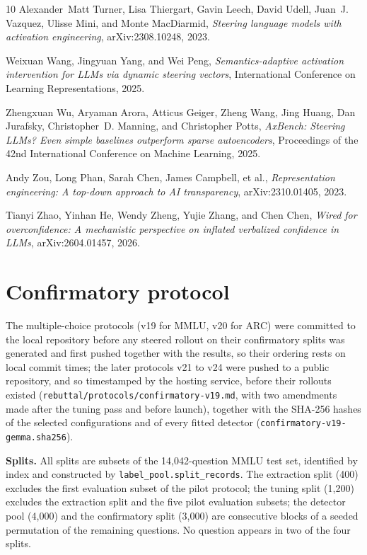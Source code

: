 \begin{thebibliography}{10}
Alexander~Matt Turner, Lisa Thiergart, Gavin Leech, David Udell, Juan~J.
  Vazquez, Ulisse Mini, and Monte MacDiarmid, \emph{Steering language models
  with activation engineering}, arXiv:2308.10248, 2023.

Weixuan Wang, Jingyuan Yang, and Wei Peng, \emph{Semantics-adaptive activation
  intervention for LLMs via dynamic steering vectors}, International Conference
  on Learning Representations, 2025.

Zhengxuan Wu, Aryaman Arora, Atticus Geiger, Zheng Wang, Jing Huang, Dan
  Jurafsky, Christopher~D. Manning, and Christopher Potts, \emph{AxBench:
  Steering LLMs? Even simple baselines outperform sparse autoencoders},
  Proceedings of the 42nd International Conference on Machine Learning, 2025.

Andy Zou, Long Phan, Sarah Chen, James Campbell, et al., \emph{Representation
  engineering: A top-down approach to AI transparency}, arXiv:2310.01405, 2023.

Tianyi Zhao, Yinhan He, Wendy Zheng, Yujie Zhang, and Chen Chen, \emph{Wired
  for overconfidence: A mechanistic perspective on inflated verbalized
  confidence in LLMs}, arXiv:2604.01457, 2026.

\end{thebibliography}

\appendix

\section{Confirmatory protocol}
\label{app:protocol}

The multiple-choice protocols (v19 for MMLU, v20 for ARC) were committed to
the local repository before any steered rollout on their confirmatory splits
was generated and first pushed together with the results, so their ordering
rests on local commit times; the later protocols v21 to v24 were pushed to a
public repository, and so timestamped by the hosting service, before their
rollouts existed (\texttt{rebuttal/protocols/confirmatory-v19.md},
with two amendments made after the tuning pass and before launch), together
with the SHA-256 hashes of the selected configurations and of every fitted
detector (\texttt{confirmatory-v19-gemma.sha256}).

\textbf{Splits.} All splits are subsets of the 14{,}042-question MMLU test set,
identified by index and constructed by \texttt{label\_pool.split\_records}. The
extraction split (400) excludes the first evaluation subset of the pilot
protocol; the tuning split (1{,}200) excludes the
extraction split and the five pilot evaluation subsets; the detector pool (4{,}000) and the confirmatory
split (3{,}000) are consecutive blocks of a seeded permutation of the
remaining questions. No question appears in two of the four splits.

